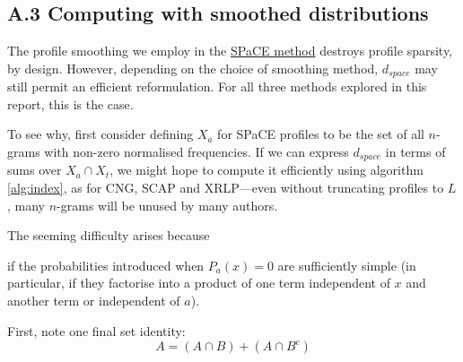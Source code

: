 \documentclass[twocolumn,10pt]{article}
\begin{document}
\subsection*{A.3 Computing with smoothed distributions}

The profile smoothing we employ in the
\hyperlink{par:space}{SPaCE method} destroys profile sparsity,
by design. However, depending on the choice of smoothing method,
$d_{space}$ may still permit an efficient reformulation.
For all three methods explored in this report, this is the case.

To see why, first consider defining $X_a$ for SPaCE profiles to
be the set of all $n$-grams with non-zero normalised frequencies.
If we can express $d_{space}$ in terms of sums over $X_a \cap X_t$,
we might hope to compute it efficiently using algorithm \ref{alg:index},
as for CNG, SCAP and XRLP---even without truncating profiles to $L$,
many $n$-grams will be unused by many authors.

The seeming difficulty arises because

if the
probabilities introduced when $P_a(x)=0$ are sufficiently simple
(in particular, if they factorise into a product of one term
independent of $x$ and another term or independent of $a$).

First, note one final set identity:
\begin{equation}
\label{eq:plus3}
A = (A \cap B) + (A \cap B^c)
\end{equation}
\end{document}
